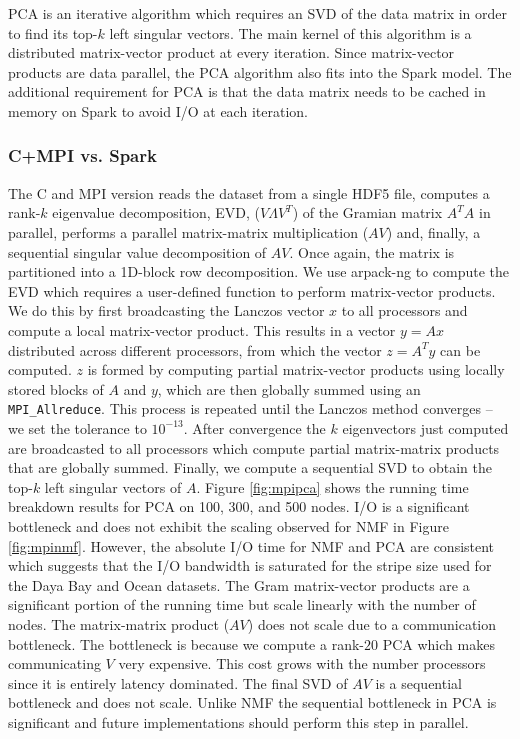 PCA is an iterative algorithm which requires an SVD of the data matrix in order to find its top-$k$ left singular vectors. The main kernel of this algorithm is a distributed matrix-vector product at every iteration. Since matrix-vector products are data parallel, the PCA algorithm also fits into the Spark model. The additional requirement for PCA is that the data matrix needs to be cached in memory on Spark to avoid I/O at each iteration.

\subsubsection{C+MPI vs. Spark}
The C and MPI version reads the dataset from a single HDF5 file, computes a rank-$k$ eigenvalue decomposition, EVD, ($V\Lambda V^T$) of the Gramian matrix $A^TA$ in parallel, performs a parallel matrix-matrix multiplication ($AV$) and, finally, a sequential singular value decomposition of $AV$. Once again, the matrix is partitioned into a 1D-block row decomposition. We use arpack-ng \cite{Lehoucq97} to compute the EVD which requires a user-defined function to perform matrix-vector products. We do this by first broadcasting the Lanczos vector $x$ to all processors and compute a local matrix-vector product. This results in a vector $y = Ax$ distributed across different processors, from which the vector $z = A^Ty$ can be computed. $z$ is formed by computing partial matrix-vector products using locally stored blocks of $A$ and $y$, which are then globally summed using an \verb+MPI_Allreduce+. This process is repeated until the Lanczos method converges -- we set the tolerance to $10^{-13}$. After convergence the $k$ eigenvectors just computed are broadcasted to all processors which compute partial matrix-matrix products that are globally summed. Finally,  we compute a sequential SVD to obtain the top-$k$ left singular vectors of $A$. Figure \ref{fig:mpipca} shows the running time breakdown results for PCA on 100, 300, and 500 nodes. I/O is a significant bottleneck and does not exhibit the scaling observed for NMF in Figure \ref{fig:mpinmf}. However, the absolute I/O time for NMF and PCA are consistent which suggests that the I/O bandwidth is saturated for the stripe size used for the Daya Bay and Ocean datasets. The Gram matrix-vector products are a significant portion of the running time but scale linearly with the number of nodes. The matrix-matrix product ($AV$) does not scale due to a communication bottleneck. The bottleneck is because we compute a rank-$20$ PCA which makes communicating $V$ very expensive. This cost grows with the number processors since it is entirely latency dominated. The final SVD of $AV$ is a sequential bottleneck and does not scale. Unlike NMF the sequential bottleneck in PCA is significant and future implementations should perform this step in parallel.

